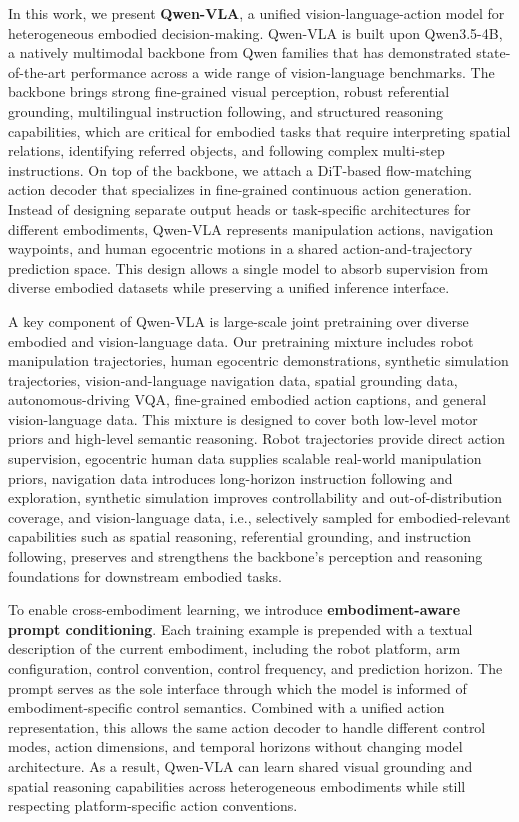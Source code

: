 \documentclass{llmxive}
\begin{document}
  
In this work, we present \textbf{Qwen-VLA}, a unified vision-language-action model for heterogeneous embodied decision-making. 
Qwen-VLA is built upon Qwen3.5-4B, a natively multimodal backbone from Qwen families that has demonstrated state-of-the-art performance across a wide range of vision-language benchmarks. The backbone brings strong fine-grained visual perception, robust referential grounding, multilingual instruction following, and structured reasoning capabilities, which are critical for embodied tasks that require interpreting spatial relations, identifying referred objects, and following complex multi-step instructions.
On top of the backbone, we attach a DiT-based flow-matching action decoder that specializes in fine-grained continuous action generation. Instead of designing separate output heads or task-specific architectures for different embodiments, Qwen-VLA represents manipulation actions, navigation waypoints, and human egocentric motions in a shared action-and-trajectory prediction space. This design allows a single model to absorb supervision from diverse embodied datasets while preserving a unified inference interface.

A key component of Qwen-VLA is large-scale joint pretraining over diverse embodied and vision-language data. Our pretraining mixture includes robot manipulation trajectories, human egocentric demonstrations, synthetic simulation trajectories, vision-and-language navigation data, spatial grounding data, autonomous-driving VQA, fine-grained embodied action captions, and general vision-language data. This mixture is designed to cover both low-level motor priors and high-level semantic reasoning. Robot trajectories provide direct action supervision, egocentric human data supplies scalable real-world manipulation priors, navigation data introduces long-horizon instruction following and exploration, synthetic simulation improves controllability and out-of-distribution coverage, and vision-language data, i.e., selectively sampled for embodied-relevant capabilities such as spatial reasoning, referential grounding, and instruction following, preserves and strengthens the backbone's perception and reasoning foundations for downstream embodied tasks.

To enable cross-embodiment learning, we introduce \textbf{embodiment-aware prompt conditioning}. Each training example is prepended with a textual description of the current embodiment, including the robot platform, arm configuration, control convention, control frequency, and prediction horizon. The prompt serves as the sole interface through which the model is informed of embodiment-specific control semantics. Combined with a unified action representation, this allows the same action decoder to handle different control modes, action dimensions, and temporal horizons without changing model architecture. As a result, Qwen-VLA can learn shared visual grounding and spatial reasoning capabilities across heterogeneous embodiments while still respecting platform-specific action conventions.
\end{document}
